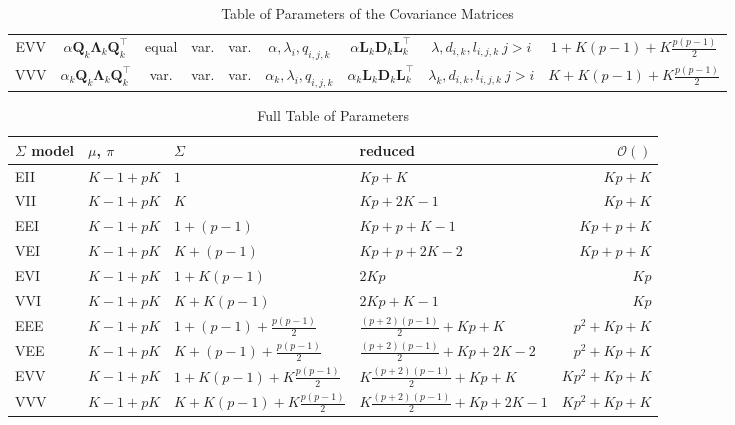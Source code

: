 \begin{table}[!htb]
{\begin{tabular}{| c | c c c c c | c c c |}
            \hline
            EVV    & $ \alpha \pmb{Q}_k \pmb{\Lambda}_k \pmb{Q}_k^\top $ & equal & var. & var. & $ \alpha, \lambda_{i}, q_{i,j,k} $ & $ \alpha \pmb{L}_k \pmb{D}_k \pmb{L}_k^\top $ & $ \lambda, d_{i,k}, l_{i,j,k}\ j>i $ & $ 1+K(p-1)+K\frac{p(p-1)}{2} $  \\
            VVV    & $ \alpha_k \pmb{Q}_k \pmb{\Lambda}_k \pmb{Q}_k^\top $ & var. & var. & var. & $ \alpha_k, \lambda_{i}, q_{i,j,k} $ & $ \alpha_k \pmb{L}_k \pmb{D}_k \pmb{L}_k^\top $ & $ \lambda_k, d_{i,k}, l_{i,j,k}\ j>i $ & $ K+K(p-1)+K\frac{p(p-1)}{2} $ \\
            \hline
        \end{tabular}
    }
    \caption{Table of Parameters of the Covariance Matrices}
    \label{table:paramSigma}
\end{table}

\clearpage

\begin{table}
    \centering
    \begin{tabular}{l|l l|l|r}
        $\Sigma$ model  & $\mu$, $\pi$  & $\Sigma$      & reduced       & $\mathcal{O}()$ \\
        \hline
        EII        & $ K -1 + pK$  & $1$                        & $Kp+K$                & $Kp+K$ \\
        VII        & $ K -1 + pK$  & $K$                        & $Kp+2K-1$             & $Kp+K$ \\
        EEI        & $ K -1 + pK$  & $1+(p-1)$                  & $Kp+p+K-1$            & $Kp+p+K$ \\
        VEI        & $ K -1 + pK$  & $K+(p-1)$                  & $Kp+p+2K-2$           & $Kp+p+K$ \\
        EVI        & $ K -1 + pK$  & $1+K(p-1)$                 & $2Kp$                 & $Kp$ \\
        VVI        & $ K -1 + pK$  & $K+K(p-1)$                 & $2Kp+K-1$             & $Kp$ \\
        EEE        & $ K -1 + pK$  & $1+(p-1)+\frac{p(p-1)}{2}$         & $\frac{(p+2)(p-1)}{2}+Kp+K$    
            & $p^2+Kp+K$ \\
        VEE        & $ K -1 + pK$  & $K+(p-1)+\frac{p(p-1)}{2}$         & $\frac{(p+2)(p-1)}{2}+Kp+2K-2$  
            & $p^2+Kp+K$ \\
        EVV        & $ K -1 + pK$  & $1+K(p-1)+K\frac{p(p-1)}{2}$       & $K\frac{(p+2)(p-1)}{2}+Kp+K$       
            & $Kp^2+Kp+K$ \\
        VVV        & $ K -1 + pK$  & $K+K(p-1)+K\frac{p(p-1)}{2}$       & $K\frac{(p+2)(p-1)}{2}+Kp+2K-1$       
            & $Kp^2+Kp+K$ \\
    \end{tabular}
    \caption{Full Table of Parameters}
    \label{table:param}
\end{table}


